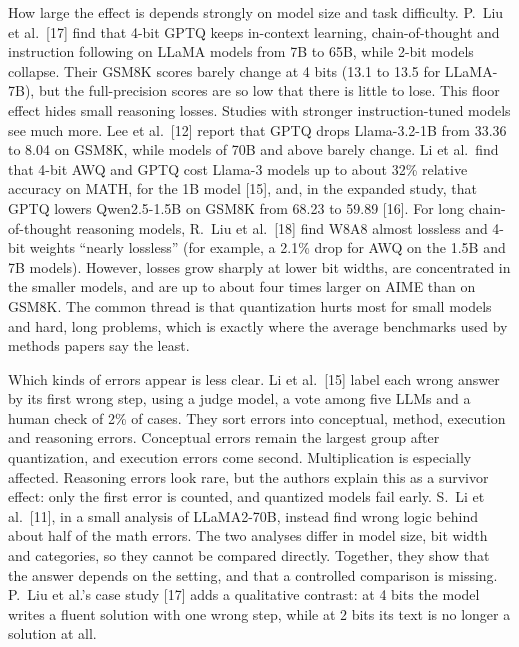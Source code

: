 \documentclass[10pt,twocolumn]{article}
\begin{document}
How large the effect is depends strongly on model size and task
difficulty. P.~Liu et al.~[17] find that 4-bit GPTQ keeps in-context
learning, chain-of-thought and instruction following on LLaMA models
from 7B to 65B, while 2-bit models collapse. Their GSM8K scores barely
change at 4 bits (13.1 to 13.5 for LLaMA-7B), but the full-precision
scores are so low that there is little to lose. This floor effect hides
small reasoning losses. Studies with stronger instruction-tuned models
see much more. Lee et al.~[12] report that GPTQ drops Llama-3.2-1B from
33.36 to 8.04 on GSM8K, while models of 70B and above barely change.
Li et al.~find that 4-bit AWQ and GPTQ cost Llama-3 models up to about
32\% relative accuracy on MATH, for the 1B model [15], and, in the
expanded study, that GPTQ lowers Qwen2.5-1.5B on GSM8K from 68.23 to
59.89 [16]. For long chain-of-thought reasoning models, R.~Liu et
al.~[18] find W8A8 almost lossless and 4-bit weights ``nearly
lossless'' (for example, a 2.1\% drop for AWQ on the 1.5B and 7B
models). However, losses grow sharply at lower bit widths, are
concentrated in the smaller models, and are up to about four times
larger on AIME than on GSM8K. The common thread is that quantization
hurts most for small models and hard, long problems, which is exactly
where the average benchmarks used by methods papers say the least.

Which kinds of errors appear is less clear. Li et al.~[15] label each
wrong answer by its first wrong step, using a judge model, a vote among
five LLMs and a human check of 2\% of cases. They sort errors into
conceptual, method, execution and reasoning errors. Conceptual errors
remain the largest group after quantization, and execution errors come
second. Multiplication is especially affected. Reasoning errors look
rare, but the authors explain this as a survivor effect: only the first
error is counted, and quantized models fail early. S.~Li et al.~[11], in
a small analysis of LLaMA2-70B, instead find wrong logic behind about
half of the math errors. The two analyses differ in model size, bit
width and categories, so they cannot be compared directly. Together,
they show that the answer depends on the setting, and that a controlled
comparison is missing. P.~Liu et al.'s case study [17] adds a
qualitative contrast: at 4 bits the model writes a fluent solution with
one wrong step, while at 2 bits its text is no longer a solution at all.
\end{document}
